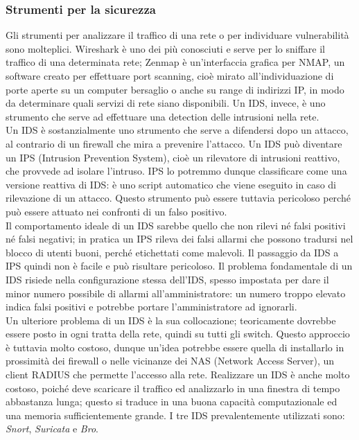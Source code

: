 \subsubsection{Strumenti per la sicurezza}
Gli strumenti per analizzare il traffico di una rete o per individuare vulnerabilità sono molteplici. Wireshark è uno dei più conosciuti e serve per lo sniffare il traffico di una determinata rete; Zenmap è un'interfaccia grafica per NMAP, un software creato per effettuare port scanning, cioè mirato all'individuazione di porte aperte su un computer bersaglio o anche su range di indirizzi IP, in modo da determinare quali servizi di rete siano disponibili. Un IDS, invece, è uno strumento che serve ad effettuare una detection delle intrusioni nella rete.\\
Un IDS è sostanzialmente uno strumento che serve a difendersi dopo un attacco, al contrario di un firewall che mira a prevenire l'attacco. Un IDS può diventare un IPS (Intrusion Prevention System), cioè un rilevatore di intrusioni reattivo, che provvede ad isolare l'intruso. IPS lo potremmo dunque classificare come una versione reattiva di IDS: è uno script automatico che viene eseguito in caso di rilevazione di un attacco. Questo strumento può essere tuttavia pericoloso perché può essere attuato nei confronti di un falso positivo.\\
Il comportamento ideale di un IDS sarebbe quello che non rilevi né falsi positivi né falsi negativi; in pratica un IPS rileva dei falsi allarmi che possono tradursi nel blocco di utenti buoni, perché etichettati come malevoli. Il passaggio da IDS a IPS quindi non è facile e può risultare pericoloso. Il problema fondamentale di un IDS risiede nella configurazione stessa dell'IDS, spesso impostata per dare il minor numero possibile di allarmi all'amministratore: un numero troppo elevato indica falsi positivi e potrebbe portare l'amministratore ad ignorarli.\\
Un ulteriore problema di un IDS è la sua collocazione; teoricamente dovrebbe essere posto in ogni tratta della rete, quindi su tutti gli switch. Questo approccio è tuttavia molto costoso, dunque un'idea potrebbe essere quella di installarlo in prossimità dei firewall o nelle vicinanze dei NAS (Network Access Server), un client RADIUS che permette l'accesso alla rete. Realizzare un IDS è anche molto costoso, poiché deve scaricare il traffico ed analizzarlo in una finestra di tempo abbastanza lunga; questo si traduce in una buona capacità computazionale ed una memoria sufficientemente grande. I tre IDS prevalentemente utilizzati sono: \textit{Snort}, \textit{Suricata} e \textit{Bro}.\\
